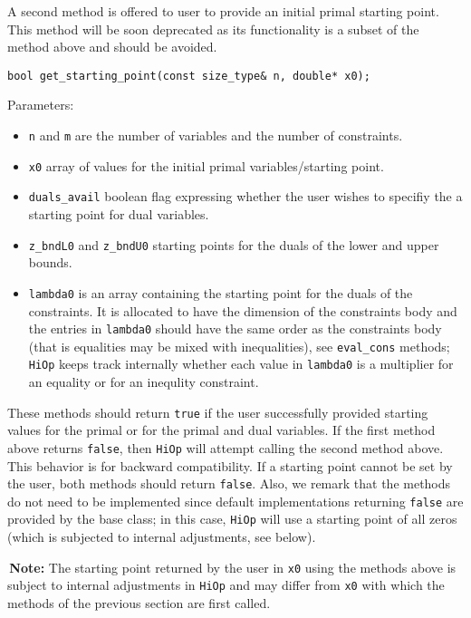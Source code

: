 \documentclass[11pt]{article}
\newcommand{\warningSymbol}{\raisebox{0.9\depth}{\danger}}
\newcommand{\warningcp}[1]{%
        \smallskip \noindent \textcolor{warningColorText}{\warningSymbol{}}\,\textbf{#1} %
    }
\newcommand{\Hi}{\texttt{HiOp}\xspace}
\begin{document}
A second method is offered to user to provide an initial primal starting point. This method will be soon deprecated as its functionality is a subset of the method above and should be avoided.

\begin{lstlisting} 
bool get_starting_point(const size_type& n, double* x0);
\end{lstlisting} 

Parameters:
\begin{itemize}
\item \texttt{n} and \texttt{m} are the number of variables and the number of constraints.
\item \texttt{x0} array of values for the initial primal variables/starting point.
\item \texttt{duals\_avail} boolean flag expressing whether the user wishes to specifiy the a starting point for dual variables.
\item \texttt{z\_bndL0} and  \texttt{z\_bndU0} starting points for the duals of the lower and upper bounds.
\item \texttt{lambda0} is an array containing the starting point for the duals of the constraints. It is allocated to have the dimension of the constraints body and the entries in \texttt{lambda0} should have the same order as the constraints body (that is equalities may be mixed with inequalities), see \texttt{eval\_cons} methods; \Hi keeps track internally whether each value in \texttt{lambda0} is a multiplier for an equality or for an inequlity constraint.
\end{itemize}
  
These methods should return \texttt{true} if the user successfully provided starting values for the primal or for the primal and dual variables. If the first method above returns \texttt{false},  then \Hi will attempt calling the second method above. This behavior is for backward compatibility. If a starting point cannot be set by the user, both methods should return \texttt{false}. Also, we remark that the  methods do not need to be implemented since  default implementations returning \texttt{false} are provided by the base class; in this case, \Hi will use a starting point of all zeros (which is subjected to internal adjustments, see below).


\warningcp{Note:} The starting point returned by the user in \texttt{x0} using the methods above is subject to internal adjustments in \Hi and may differ from \texttt{x0} with which the methods of the previous section are first called.
\end{document}
